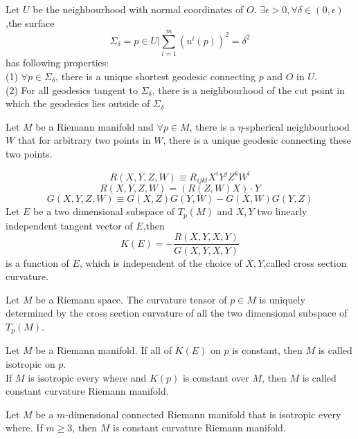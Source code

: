 \begin{newthem}
Let $U$ be the neighbourhood with normal coordinates of $O$. $\exists \epsilon >0, \forall \delta \in (0,\epsilon)$,the surface
\[\Sigma_{\delta} = {p \in U | \sum_{i=1}^{m}} (u^i(p))^2 = \delta^2\]
has following properties:\\
(1) $\forall p \in \Sigma_{\delta}$, there is a unique shortest geodesic connecting $p$ and $O$ in $U$.\\
(2) For all geodesics tangent to $\Sigma_{\delta}$, there is a neighbourhood of the cut point in which the geodesics lies outside of $\Sigma_{\delta}$
\end{newthem}

\begin{newthem}
Let $M$ be a Riemann manifold and $\forall p \in M$, there is a $\eta$-spherical neighbourhood $W$ that for arbitrary two points in $W$, there is a unique geodesic connecting these two points.
\end{newthem}

\begin{newdef}
\[R(X,Y,Z,W) \equiv R_{ijkl}X^iY^jZ^kW^l\]
\[R(X,Y,Z,W) = (R(Z,W)X) \cdot Y\]
\[G(X,Y,Z,W) \equiv G(X,Z)G(Y,W) - G(X,W)G(Y,Z)\]
Let $E$ be a two dimensional subspace of $T_p(M)$ and $X,Y$ two linearly independent tangent vector of $E$,then
\[K(E) = -\frac{R(X,Y,X,Y)}{G(X,Y,X,Y)}\]
is a function of $E$, which is independent of the choice of $X,Y$,called cross section curvature.
\end{newdef}

\begin{newthem} 
Let $M$ be a Riemann space. The curvature tensor of $p \in M$ is uniquely determined by the cross section curvature of all the two dimensional subspace of $T_p(M)$.
\end{newthem}

\begin{newdef}
Let $M$ be a Riemann manifold. If all of $K(E)$ on $p$ is constant, then $M$ is called isotropic on $p$. \\
If $M$ is isotropic every where and $K(p)$ is constant over $M$, then $M$ is called constant curvature Riemann manifold.
\end{newdef}

\begin{newthem} 
Let $M$ be a $m$-dimensional connected Riemann manifold that is isotropic every where. If $m \geq 3$, then $M$ is constant curvature Riemann manifold.
\end{newthem}

